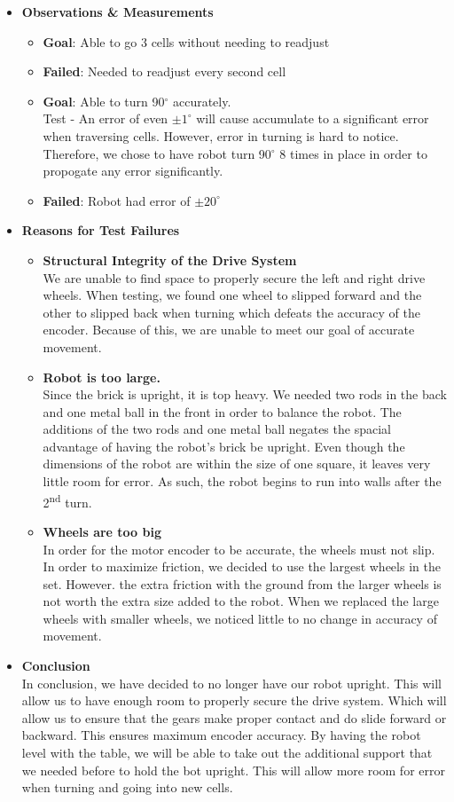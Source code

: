 \documentclass[11pt]{article}
\newcommand{\ts}{\textsuperscript}
\begin{document}
\begin{itemize}
\item \textbf{Observations \& Measurements}
	\begin{itemize}
	\item \textbf{Goal}: Able to go 3 cells without needing to readjust
	\item \textbf{Failed}: Needed to readjust every second cell
	\item \textbf{Goal}: Able to turn 90$^{\circ}$ accurately.\\
	Test - An error of even $ \pm 1^{\circ}$ will cause accumulate to a significant error when traversing cells. However, error in turning is hard to notice. Therefore, we chose to have robot turn 90$^{\circ}$ 8 times in place in order to propogate any error significantly.
	\item \textbf{Failed}: Robot had error of $ \pm 20^{\circ}$
	\end{itemize}
\item \textbf{Reasons for Test Failures}
	\begin{itemize}
	\item \textbf{Structural Integrity of the Drive System}\\
	We are unable to find space to properly secure the left and right drive wheels. When testing, we found one wheel to slipped forward and the other to slipped back when turning which defeats the accuracy of the encoder. Because of this, we are unable to meet our goal of accurate movement.
	\item \textbf{Robot is too large.}\\
	Since the brick is upright, it is top heavy. We needed two rods in the back and one metal ball in the front in order to balance the robot. The additions of the two rods and one metal ball negates the spacial advantage of having the robot's brick be upright. Even though the dimensions of the robot are within the size of one square, it leaves very little room for error. As such, the robot begins to run into walls after the 2\ts{nd} turn.
	\item \textbf{Wheels are too big}\\
	In order for the motor encoder to be accurate, the wheels must not slip. In order to maximize friction, we decided to use the largest wheels in the set. However. the extra friction with the ground from the larger wheels is not worth the extra size added to the robot. When we replaced the large wheels with smaller wheels, we noticed little to no change in accuracy of movement.
	\end{itemize}
\item \textbf{Conclusion}\\
In conclusion, we have decided to no longer have our robot upright. This will allow us to have enough room to properly secure the drive system. Which will allow us to ensure that the gears make proper contact and do slide forward or backward. This ensures maximum encoder accuracy. By having the robot level with the table, we will be able to take out the additional support that we needed before to hold the bot upright. This will allow more room for error when turning and going into new cells.
\end{itemize}
\newpage
\end{document}
